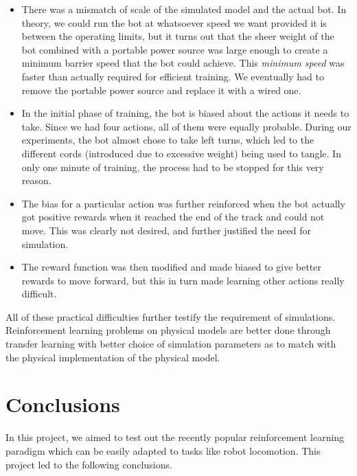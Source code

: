 \documentclass[12pt]{extreport}
\begin{document}
\begin{itemize}
    \item There was a mismatch of scale of the simulated model and the actual bot. In theory, we could run the bot at whatsoever speed we want provided it is between the operating limits, but it turns out that the sheer weight of the bot combined with a portable power source was large enough to create a minimum barrier speed that the bot could achieve. This \emph{minimum speed} was faster than actually required for efficient training. We eventually had to remove the portable power source and replace it with a wired one.
    \item In the initial phase of training, the bot is biased about the actions it needs to take. Since we had four actions, all of them were equally probable. During our experiments, the bot almost chose to take left turns, which led to the different cords (introduced due to excessive weight) being used to tangle. In only one minute of training, the process had to be stopped for this very reason.
    \item The bias for a particular action was further reinforced when the bot actually got positive rewards when it reached the end of the track and could not move. This was clearly not desired, and further justified the need for simulation.
    \item The reward function was then modified and made biased to give better rewards to move forward, but this in turn made learning other actions really difficult.
\end{itemize}

All of these practical difficulties further testify the requirement of simulations. Reinforcement learning problems on physical models are better done through transfer learning with better choice of simulation parameters as to match with the physical implementation of the physical model.

\chapter{Conclusions}
In this project, we aimed to test out the recently popular reinforcement learning paradigm which can be easily adapted to tasks like robot locomotion. This project led to the following conclusions.
\end{document}
